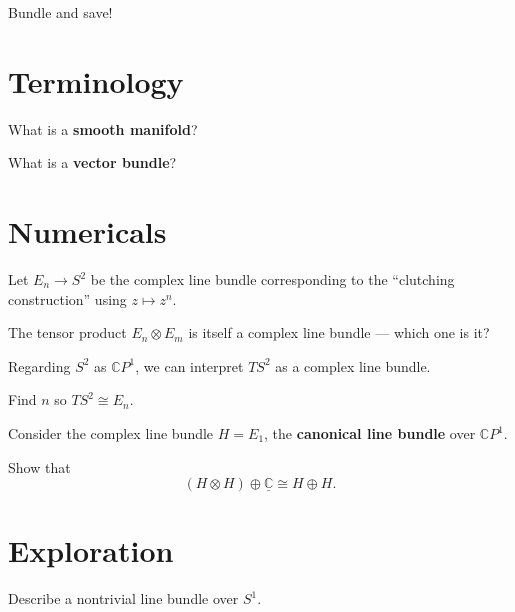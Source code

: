 \documentclass{homework}
\author{Jim Fowler}
\begin{document}
\maketitle

\begin{inspiration}
  Bundle and save!
\end{inspiration}

\section{Terminology}

\begin{problem}
What is a \textbf{smooth manifold}?
\end{problem}

\begin{problem}
What is a \textbf{vector bundle}?
\end{problem}

\section{Numericals}

\begin{problem}
  Let $E_n \to S^2$ be the complex line bundle corresponding to the
  ``clutching construction'' using $z \mapsto z^n$.

  The tensor product $E_n \otimes E_m$ is itself a complex line bundle
  --- which one is it?
\end{problem}

\begin{problem}
  Regarding $S^2$ as $\mathbb{C}P^1$, we can interpret $TS^2$ as a complex line bundle.

  Find $n$ so $TS^2 \cong E_n$.
\end{problem}

\begin{problem}
  Consider the complex line bundle $H = E_1$, the \textbf{canonical line bundle} over  $\mathbb{C}P^1$.

  Show that
  \[
    (H \otimes H) \oplus \underline{\mathbb{C}} \cong H \oplus H.
  \]
\end{problem}

\section{Exploration}

\begin{problem}
  Describe a nontrivial line bundle over $S^1$.\label{mobius-bundle}
\end{problem}
\end{document}
